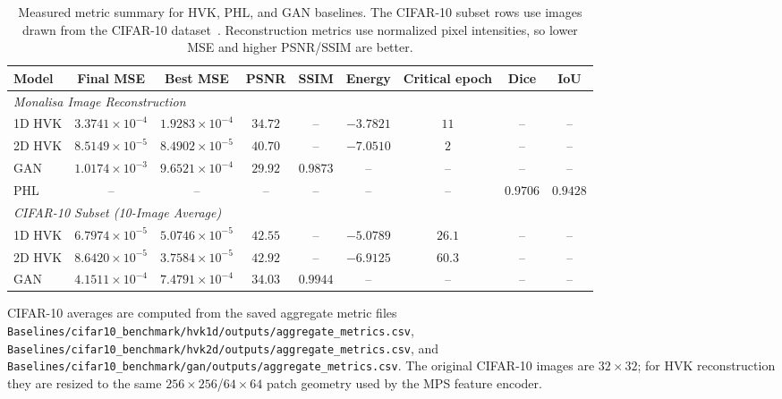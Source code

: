 \documentclass[11pt]{article}
\begin{document}
\begin{table}[h]
\centering
\caption{Measured metric summary for HVK, PHL, and GAN baselines. The CIFAR-10 subset rows use images drawn from the CIFAR-10 dataset~\cite{krizhevsky2009learning}. Reconstruction metrics use normalized pixel intensities, so lower MSE and higher PSNR/SSIM are better.}
\label{tab:phl_gan_benchmark}
\small
\setlength{\tabcolsep}{3pt}
\begin{tabular}{lcccccccc}
\toprule
Model & Final MSE & Best MSE & PSNR & SSIM & Energy & Critical epoch & Dice & IoU \\
\midrule
\multicolumn{9}{l}{\textit{Monalisa Image Reconstruction}} \\
1D HVK & $3.3741\times10^{-4}$ & $1.9283\times10^{-4}$ & $34.72$ & -- & $-3.7821$ & $11$ & -- & -- \\
2D HVK & $8.5149\times10^{-5}$ & $8.4902\times10^{-5}$ & $40.70$ & -- & $-7.0510$ & $2$ & -- & -- \\
GAN & $1.0174\times10^{-3}$ & $9.6521\times10^{-4}$ & $29.92$ & $0.9873$ & -- & -- & -- & -- \\
PHL & -- & -- & -- & -- & -- & -- & $0.9706$ & $0.9428$ \\
\midrule
\multicolumn{9}{l}{\textit{CIFAR-10 Subset (10-Image Average)}} \\
1D HVK & $6.7974\times10^{-5}$ & $5.0746\times10^{-5}$ & $42.55$ & -- & $-5.0789$ & $26.1$ & -- & -- \\
2D HVK & $8.6420\times10^{-5}$ & $3.7584\times10^{-5}$ & $42.92$ & -- & $-6.9125$ & $60.3$ & -- & -- \\
GAN & $4.1511\times10^{-4}$ & $7.4791\times10^{-4}$ & $34.03$ & $0.9944$ & -- & -- & -- & -- \\
\bottomrule
\end{tabular}
\parbox{0.96\linewidth}{\footnotesize
CIFAR-10 averages are computed from the saved aggregate metric files
\texttt{Baselines/cifar10\_benchmark/hvk1d/outputs/aggregate\_metrics.csv},
\texttt{Baselines/cifar10\_benchmark/hvk2d/outputs/aggregate\_metrics.csv},
and
\texttt{Baselines/cifar10\_benchmark/gan/outputs/aggregate\_metrics.csv}.
The original CIFAR-10 images are $32\times32$; for HVK reconstruction they are resized to the same $256\times256$/$64\times64$ patch geometry used by the MPS feature encoder.}
\end{table}
\end{document}
